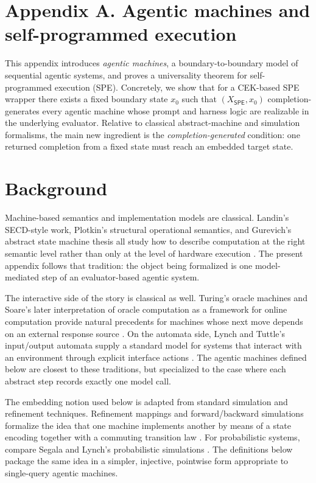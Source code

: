 \documentclass[11pt]{article}
\newcommand{\SPE}{\mathsf{SPE}}
\begin{document}
\section*{Appendix A. Agentic machines and self-programmed execution}

This appendix introduces \emph{agentic machines}, a boundary-to-boundary model of sequential agentic systems, and proves a universality theorem for self-programmed execution (SPE). Concretely, we show that for a CEK-based SPE wrapper there exists a fixed boundary state $x_0$ such that $(X_{\SPE},x_0)$ completion-generates every agentic machine whose prompt and harness logic are realizable in the underlying evaluator. Relative to classical abstract-machine and simulation formalisms, the main new ingredient is the \emph{completion-generated} condition: one returned completion from a fixed state must reach an embedded target state.

\setcounter{section}{0}
\renewcommand{\thesection}{A.\arabic{section}}

\section{Background}

Machine-based semantics and implementation models are classical. Landin's SECD-style work, Plotkin's structural operational semantics, and Gurevich's abstract state machine thesis all study how to describe computation at the right semantic level rather than only at the level of hardware execution \cite{Landin64,Plotkin81,Gurevich00}. The present appendix follows that tradition: the object being formalized is one model-mediated step of an evaluator-based agentic system.

The interactive side of the story is classical as well. Turing's oracle machines and Soare's later interpretation of oracle computation as a framework for online computation provide natural precedents for machines whose next move depends on an external response source \cite{Turing39,Soare09}. On the automata side, Lynch and Tuttle's input/output automata supply a standard model for systems that interact with an environment through explicit interface actions \cite{LynchTuttle89}. The agentic machines defined below are closest to these traditions, but specialized to the case where each abstract step records exactly one model call.

The embedding notion used below is adapted from standard simulation and refinement techniques. Refinement mappings and forward/backward simulations formalize the idea that one machine implements another by means of a state encoding together with a commuting transition law \cite{AbadiLamport91,LynchVaandrager95}. For probabilistic systems, compare Segala and Lynch's probabilistic simulations \cite{SegalaLynch95}. The definitions below package the same idea in a simpler, injective, pointwise form appropriate to single-query agentic machines.
\end{document}
